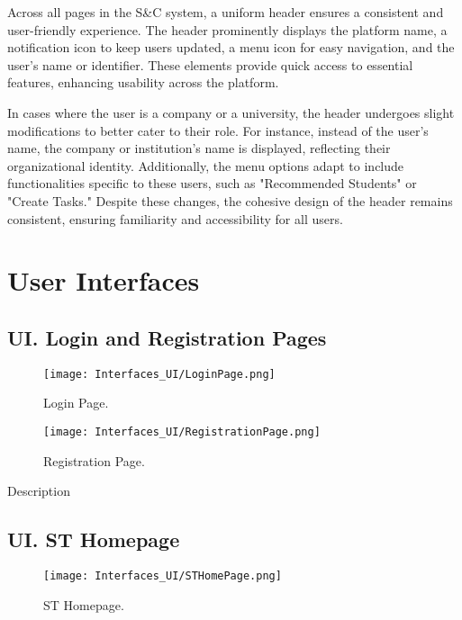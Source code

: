 Across all pages in the S\&C system, a uniform header ensures a consistent and user-friendly experience. The header prominently displays the platform name, a notification icon to keep users updated, a menu icon for easy navigation, and the user’s name or identifier. These elements provide quick access to essential features, enhancing usability across the platform.

In cases where the user is a company or a university, the header undergoes slight modifications to better cater to their role. For instance, instead of the user's name, the company or institution’s name is displayed, reflecting their organizational identity. Additionally, the menu options adapt to include functionalities specific to these users, such as "Recommended Students" or "Create Tasks." Despite these changes, the cohesive design of the header remains consistent, ensuring familiarity and accessibility for all users.
 

\newpage

\section{User Interfaces}
\setcounter{ui}{1}
\newcommand{\cui}{\theui{}}

\subsection*{UI\cui . Login and Registration Pages}

\begin{figure}[H]
    \begin{center}
        \texttt{[image: Interfaces\_UI/LoginPage.png]}
        \caption{Login Page.}
        \label{fig:login_page}%
    \end{center}

    \begin{center}
        \texttt{[image: Interfaces\_UI/RegistrationPage.png]}
        \caption{Registration Page.}
        \label{fig:registration_page}%
    \end{center}
\end{figure}

Description 

\subsection*{UI\cui . ST Homepage}

\begin{figure}[H]
    \begin{center}
        \texttt{[image: Interfaces\_UI/STHomePage.png]}
        \caption{ST Homepage.}
        \label{fig:st_homepage}%
    \end{center}
\end{figure}

